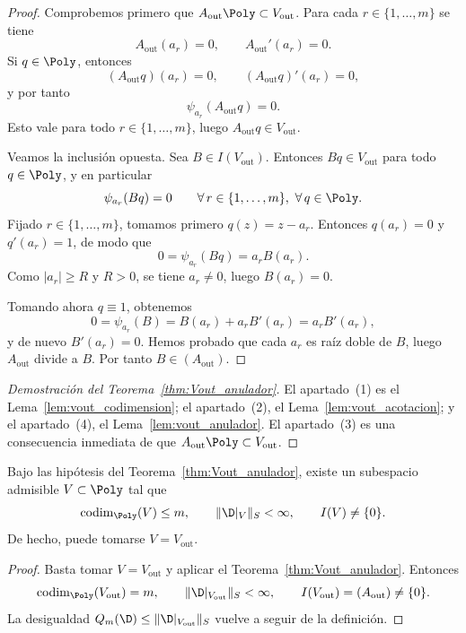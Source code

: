 \begin{proof}
Comprobemos primero que $A_{\mathrm{out}}\Poly\subset V_{\mathrm{out}}$. Para cada $r\in\{1,\dots,m\}$ se tiene
\[
A_{\mathrm{out}}(a_r)=0,
\qquad
A_{\mathrm{out}}'(a_r)=0.
\]
Si $q\in\Poly$, entonces
\[
(A_{\mathrm{out}}q)(a_r)=0,
\qquad
(A_{\mathrm{out}}q)'(a_r)=0,
\]
y por tanto
\[
\psi_{a_r}(A_{\mathrm{out}}q)=0.
\]
Esto vale para todo $r\in\{1,\dots,m\}$, luego $A_{\mathrm{out}}q\in V_{\mathrm{out}}$.

Veamos la inclusión opuesta. Sea $B\in I(V_{\mathrm{out}})$. Entonces $Bq\in V_{\mathrm{out}}$ para todo $q\in\Poly$, y en particular
\[
\psi_{a_r}(Bq)=0
\qquad \forall\,r\in\{1,\dots,m\},\ \forall\,q\in\Poly.
\]
Fijado $r\in\{1,\dots,m\}$, tomamos primero $q(z)=z-a_r$. Entonces $q(a_r)=0$ y $q'(a_r)=1$, de modo que
\[
0=\psi_{a_r}(Bq)=a_rB(a_r).
\]
Como $|a_r|\ge R$ y $R>0$, se tiene $a_r\ne0$, luego $B(a_r)=0$.

Tomando ahora $q\equiv1$, obtenemos
\[
0=\psi_{a_r}(B)=B(a_r)+a_rB'(a_r)=a_rB'(a_r),
\]
y de nuevo $B'(a_r)=0$. Hemos probado que cada $a_r$ es raíz doble de $B$, luego $A_{\mathrm{out}}$ divide a $B$. Por tanto $B\in(A_{\mathrm{out}})$.
\end{proof}

\begin{proof}[Demostración del Teorema~\ref{thm:Vout_anulador}]
El apartado~(1) es el Lema~\ref{lem:vout_codimension}; el apartado~(2), el Lema~\ref{lem:vout_acotacion}; y el apartado~(4), el Lema~\ref{lem:vout_anulador}. El apartado~(3) es una consecuencia inmediata de que $A_{\mathrm{out}}\Poly\subset V_{\mathrm{out}}$.
\end{proof}

\begin{cor}\label{cor:existencia_V_estable_anulador}
Bajo las hipótesis del Teorema~\ref{thm:Vout_anulador}, existe un subespacio admisible $V\subset\Poly$ tal que
\[
\operatorname{codim}_{\Poly}(V)\le m,
\qquad
\|\D|_V\|_S<\infty,
\qquad
I(V)\ne\{0\}.
\]
De hecho, puede tomarse $V=V_{\mathrm{out}}$.
\end{cor}

\begin{proof}
Basta tomar $V=V_{\mathrm{out}}$ y aplicar el Teorema~\ref{thm:Vout_anulador}. Entonces
\[
\operatorname{codim}_{\Poly}(V_{\mathrm{out}})=m,
\qquad
\|\D|_{V_{\mathrm{out}}}\|_S<\infty,
\qquad
I(V_{\mathrm{out}})=(A_{\mathrm{out}})\ne\{0\}.
\]
La desigualdad $Q_m(\D)\le \|\D|_{V_{\mathrm{out}}}\|_S$ vuelve a seguir de la definición.
\end{proof}

